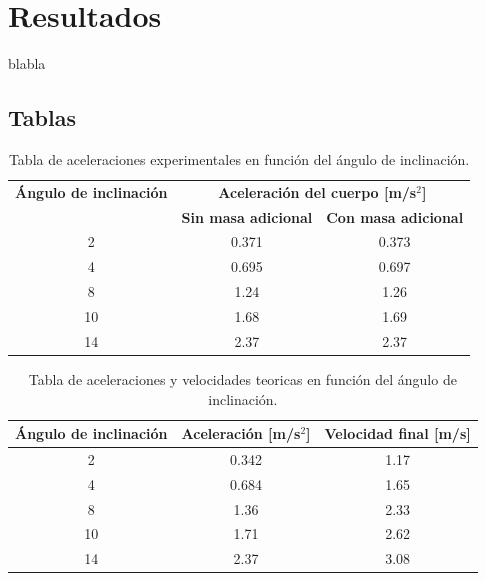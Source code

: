 \documentclass[twocolumn,12pt]{article}
\begin{document}
	\section{Resultados}
	blabla
	
	\subsection{Tablas}

	\onecolumn
	\begin{table}[h!]
	\centering
	\begin{tabular}{|c|c|c|}
	\hline
	\textbf{Ángulo de inclinación} & \multicolumn{2}{c|}{\textbf{Aceleración del cuerpo [m/s\(^2\)]}} \\ \cline{2-3}
	\textbf{} & \textbf{Sin masa adicional} & \textbf{Con masa adicional} \\ \hline
	2\textdegree & 0.371 & 0.373 \\ \hline
	4\textdegree & 0.695 & 0.697 \\ \hline
	8\textdegree & 1.24 & 1.26 \\ \hline
	10\textdegree & 1.68 & 1.69 \\ \hline
	14\textdegree & 2.37 & 2.37 \\ \hline
	\end{tabular}
	\caption{Tabla de aceleraciones experimentales en función del ángulo de inclinación.}
	\label{tabla:aceleraciones}
	\end{table}
	
	\begin{table}[h!]
	\centering
	\begin{tabular}{|c|c|c|}
	\hline
	\textbf{Ángulo de inclinación} & \textbf{Aceleración [m/s\(^2\)]} & \textbf{Velocidad final [m/s]} \\ \hline
	2\textdegree & 0.342 & 1.17 \\ \hline
	4\textdegree & 0.684 & 1.65 \\ \hline
	8\textdegree & 1.36 & 2.33 \\ \hline
	10\textdegree & 1.71 & 2.62 \\ \hline
	14\textdegree & 2.37 & 3.08 \\ \hline
	\end{tabular}
	\caption{Tabla de aceleraciones y velocidades teoricas en función del ángulo de inclinación.}
	\label{tabla:caida_galileo}
	\end{table}
\end{document}
